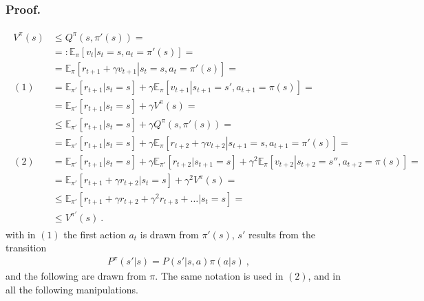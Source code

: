 \documentclass[letterpaper,10pt,english]{jupyterBook}
\begin{document}
\subsubsection*{Proof.}
\begin{equation*}
\begin{split}\begin{aligned}
  V^{\pi}(s)
  & \le Q^{\pi}(s,\pi'(s)) = \\
  & =: \mathbb{E}_{\pi} \left[ \left. v_t  \right| s_t = s, a_t = \pi'(s) \right] = \\
  & =  \mathbb{E}_{\pi} \left[ \left. r_{t+1} + \gamma v_{t+1}  \right| s_t = s, a_t = \pi'(s) \right] = \\
 (1) & =  \mathbb{E}_{\pi'} \left[ r_{t+1} | s_t = s \right] + \gamma \mathbb{E}_{\pi} \left[ \left. v_{t+1}  \right| s_{t+1} = s', a_{t+1} = \pi(s) \right] = \\
  & =   \mathbb{E}_{\pi'} \left[ r_{t+1} | s_t = s \right] + \gamma V^{\pi}(s) = \\
  & \le \mathbb{E}_{\pi'} \left[ r_{t+1} | s_t = s \right] + \gamma Q^{\pi}(s,\pi'(s)) = \\
  & =   \mathbb{E}_{\pi'} \left[ r_{t+1} | s_t = s \right] + \gamma \mathbb{E}_{\pi} \left[ \left. r_{t+2} + \gamma v_{t+2}  \right| s_{t+1} = s, a_{t+1} = \pi'(s) \right] = \\
 (2) & =   \mathbb{E}_{\pi'} \left[ r_{t+1} | s_t = s \right] + \gamma \mathbb{E}_{\pi'} \left[ r_{t+2} | s_{t+1} = s \right] + \gamma^2 \mathbb{E}_{\pi} \left[ \left. v_{t+2}  \right| s_{t+2} = s'', a_{t+2} = \pi(s) \right] = \\
  & =   \mathbb{E}_{\pi'} \left[ r_{t+1} + \gamma r_{t+2}  | s_t = s \right] + \gamma^2 V^{\pi}(s) = \\
  & \le \mathbb{E}_{\pi'} \left[ r_{t+1} + \gamma r_{t+2} + \gamma^2 r_{t+3} + \dots | s_t = s \right] = \\
  & \le V^{\pi'}(s) \ .
\end{aligned}\end{split}
\end{equation*}
\sphinxAtStartPar
with in \((1)\) the first action \(a_t\) is drawn from \(\pi'(s)\), \(s'\) results from the transition
\begin{equation*}
\begin{split}P^{\pi}(s'|s) = P(s'|s,a)\pi(a|s) \ ,\end{split}
\end{equation*}
\sphinxAtStartPar
and the following are drawn from \(\pi\). The same notation is used in \((2)\), and in all the following manipulations.
\end{document}
